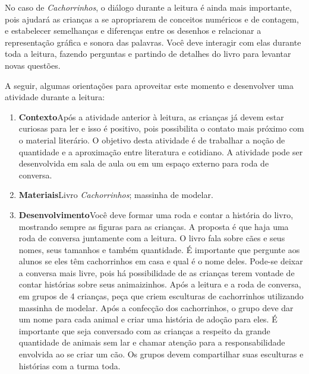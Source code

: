 \documentclass[11pt]{extarticle}
\begin{document}
No caso de \textit{Cachorrinhos}, o diálogo durante a leitura é 
ainda mais importante, pois ajudará as crianças a se apropriarem de conceitos numéricos e de contagem, e estabelecer semelhanças e diferenças entre os desenhos e relacionar a representação gráfica e sonora das palavras.
Você deve interagir com elas durante toda a 
leitura, fazendo perguntas e partindo de detalhes do livro para 
levantar novas questões. 

A seguir, algumas orientações para aproveitar este momento e desenvolver uma atividade durante a leitura: 

\begin{enumerate}
\item \textbf{Contexto}\quad Após a atividade anterior à leitura, as crianças já devem estar curiosas para ler e isso é positivo, pois possibilita o contato mais próximo com o material literário. O objetivo desta atividade é de trabalhar a noção de quantidade e a aproximação entre literatura e cotidiano. A atividade pode ser desenvolvida em sala de aula ou em um espaço externo para roda de conversa.

\item \textbf{Materiais}\quad Livro \textit{Cachorrinhos}; massinha de modelar.


\item \textbf{Desenvolvimento}\quad Você deve formar uma roda e contar a história do livro, mostrando sempre as figuras para as crianças. A proposta é que haja uma roda de conversa juntamente com a leitura. O livro fala sobre cães e seus nomes, seus tamanhos e também quantidade. É importante que pergunte aos alunos se eles têm cachorrinhos em casa e qual é o nome deles. Pode-se deixar a conversa mais livre, pois há possibilidade de as crianças terem vontade de contar histórias sobre seus animaizinhos. Após a leitura e a roda de conversa, em grupos de 4 crianças, peça que criem esculturas de cachorrinhos utilizando massinha de modelar. Após a confecção dos cachorrinhos, o grupo deve dar um nome para cada animal e criar uma história de adoção para eles. É importante que seja conversado com as crianças a respeito da grande quantidade de animais sem lar e chamar atenção para a responsabilidade envolvida ao se criar um cão. Os grupos devem compartilhar suas esculturas e histórias com a turma toda.
 

\end{enumerate}
\end{document}
